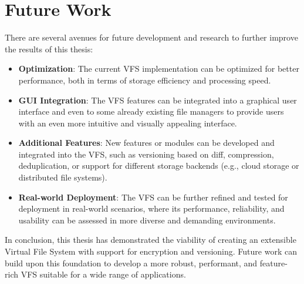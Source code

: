 \section{Future Work}\label{sec:future-work}

There are several avenues for future development and research to further improve the results of this thesis:

\begin{itemize}
    \item \textbf{Optimization}: The current VFS implementation can be optimized for better performance, both in terms of storage efficiency and processing speed.
    \item \textbf{GUI Integration}: The VFS features can be integrated into a graphical user interface and even to some already existing file managers to provide users with an even more intuitive and visually appealing interface.
    \item \textbf{Additional Features}: New features or modules can be developed and integrated into the VFS, such as versioning based on diff, compression, deduplication, or support for different storage backends (e.g., cloud storage or distributed file systems).
    \item \textbf{Real-world Deployment}: The VFS can be further refined and tested for deployment in real-world scenarios, where its performance, reliability, and usability can be assessed in more diverse and demanding environments.
\end{itemize}

In conclusion, this thesis has demonstrated the viability of creating an extensible Virtual File System with support for encryption and versioning.
Future work can build upon this foundation to develop a more robust, performant, and feature-rich VFS suitable for a wide range of applications.